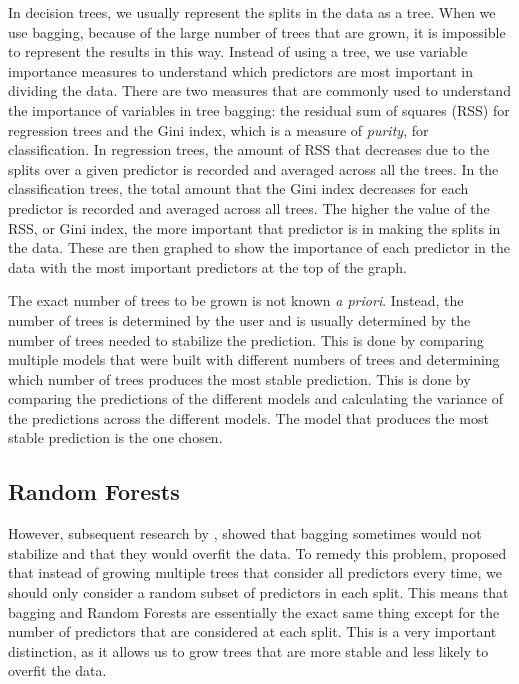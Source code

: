In decision trees, we usually represent the splits in the data as a tree. When we use bagging, because of the large number of trees that are grown, it is impossible to represent the results in this way. Instead of using a tree, we use variable importance measures to understand which predictors are most important in dividing the data. There are two measures that are commonly used to understand the importance of variables in tree bagging: the residual sum of squares (RSS) for regression trees and the Gini index, which is a measure of \textit{purity}, for classification. In regression trees, the amount of RSS that decreases due to the splits over a given predictor is recorded and averaged across all the trees. In the classification trees, the total amount that the Gini index decreases for each predictor is recorded and averaged across all trees. The higher the value of the RSS, or Gini index, the more important that predictor is in making the splits in the data. These are then graphed to show the importance of each predictor in the data with the most important predictors at the top of the graph.

The exact number of trees to be grown is not known \textit{a priori}. Instead, the number of trees is determined by the user and is usually determined by the number of trees needed to stabilize the prediction. This is done by comparing multiple models that were built with different numbers of trees and determining which number of trees produces the most stable prediction. This is done by comparing the predictions of the different models and calculating the variance of the predictions across the different models. The model that produces the most stable prediction is the one chosen.

\subsection{Random Forests} \label{sec:random_forests}

However, subsequent research by \citet{breimanRandomForests2001}, showed that bagging sometimes would not stabilize and that they would overfit the data. To remedy this problem, \citeauthor{breimanRandomForests2001} proposed that instead of growing multiple trees that consider all predictors every time, we should only consider a random subset of predictors in each split. This means that bagging and Random Forests are essentially the exact same thing except for the number of predictors that are considered at each split. This is a very important distinction, as it allows us to grow trees that are more stable and less likely to overfit the data. 

